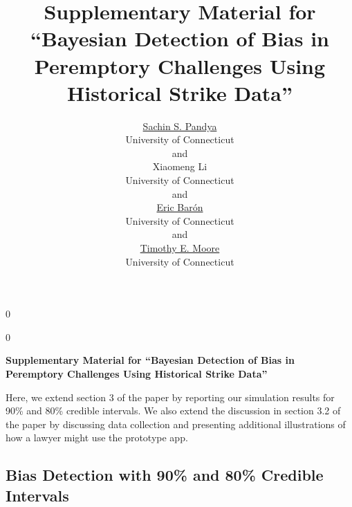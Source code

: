 \documentclass[12pt]{article}
\newcommand{\blind}{0}
\begin{document}
\def\spacingset#1{\renewcommand{\baselinestretch}%
{#1}\small\normalsize} \spacingset{1}



\blind
{
  \title{\bf Supplementary Material for ``Bayesian Detection of Bias in Peremptory Challenges Using Historical Strike Data''}

  \author{
        \href{https://orcid.org/0000-0001-7387-1307}{Sachin S. Pandya} \\
    University of Connecticut\\
     and \\     Xiaomeng Li \\
    University of Connecticut\\
     and \\     \href{https://orcid.org/0000-0003-1934-1932}{Eric Barón} \\
    University of Connecticut\\
     and \\     \href{https://orcid.org/0000-0002-9576-0517}{Timothy E. Moore} \\
    University of Connecticut\\
      }
  \maketitle
} \fi

\blind
{
  \bigskip
  \bigskip
  \bigskip
  \begin{center}
    {\LARGE\bf Supplementary Material for ``Bayesian Detection of Bias in Peremptory Challenges Using Historical Strike Data''}
  \end{center}
  \medskip
} \fi

\bigskip

\noindent%
 

\vfill

\newpage
\spacingset{1.9} %

Here, we extend section 3 of the paper by reporting our simulation results for 90\% and 80\% credible intervals. We also extend the discussion in section 3.2 of the paper by discussing data collection and presenting additional illustrations of how a lawyer might use the prototype app.

\hypertarget{bias-detection-with-90-and-80-credible-intervals}{%
\subsection{Bias Detection with 90\% and 80\% Credible Intervals}\label{bias-detection-with-90-and-80-credible-intervals}}
\end{document}
